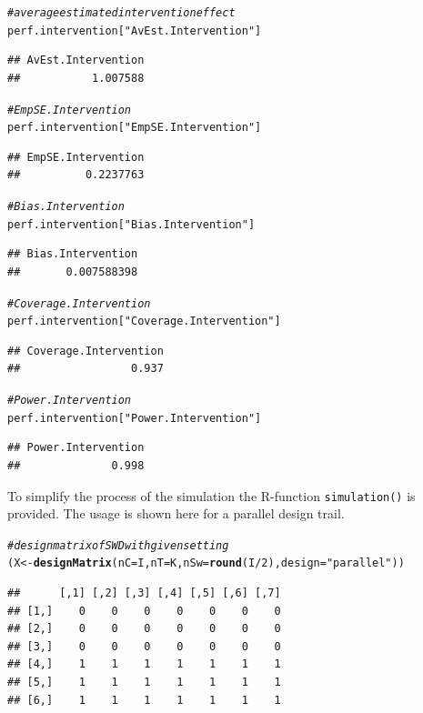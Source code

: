 \documentclass{article}\usepackage[]{graphicx}\usepackage[]{color}
\makeatletter
\newcommand{\hlnum}[1]{\textcolor[rgb]{0.686,0.059,0.569}{#1}}%
\newcommand{\hlstr}[1]{\textcolor[rgb]{0.192,0.494,0.8}{#1}}%
\newcommand{\hlcom}[1]{\textcolor[rgb]{0.678,0.584,0.686}{\textit{#1}}}%
\newcommand{\hlopt}[1]{\textcolor[rgb]{0,0,0}{#1}}%
\newcommand{\hlstd}[1]{\textcolor[rgb]{0.345,0.345,0.345}{#1}}%
\newcommand{\hlkwb}[1]{\textcolor[rgb]{0.69,0.353,0.396}{#1}}%
\newcommand{\hlkwc}[1]{\textcolor[rgb]{0.333,0.667,0.333}{#1}}%
\newcommand{\hlkwd}[1]{\textcolor[rgb]{0.737,0.353,0.396}{\textbf{#1}}}%
\newenvironment{kframe}{%
 \def\at@end@of@kframe{}%
 \ifinner\ifhmode%
  \def\at@end@of@kframe{\end{minipage}}%
  \begin{minipage}{\columnwidth}%
 \fi\fi%
 \def\FrameCommand##1{\hskip\@totalleftmargin \hskip-\fboxsep
 \colorbox{shadecolor}{##1}\hskip-\fboxsep
     \hskip-\linewidth \hskip-\@totalleftmargin \hskip\columnwidth}%
 \MakeFramed {\advance\hsize-\width
   \@totalleftmargin\z@ \linewidth\hsize
   \@setminipage}}%
 {\par\unskip\endMakeFramed%
 \at@end@of@kframe}
\newenvironment{knitrout}{}{} %
\newcommand{\Rfunction}[1]{{\texttt{#1}}}
\makeatother
\begin{document}
\begin{knitrout}
\begin{kframe}
\begin{alltt}
\hlcom{# average estimated intervention effect}
\hlstd{perf.intervention[}\hlstr{"AvEst.Intervention"}\hlstd{]}
\end{alltt}
\begin{verbatim}
## AvEst.Intervention 
##           1.007588
\end{verbatim}
\begin{alltt}
\hlcom{# EmpSE.Intervention}
\hlstd{perf.intervention[}\hlstr{"EmpSE.Intervention"}\hlstd{]}
\end{alltt}
\begin{verbatim}
## EmpSE.Intervention 
##          0.2237763
\end{verbatim}
\begin{alltt}
\hlcom{# Bias.Intervention}
\hlstd{perf.intervention[}\hlstr{"Bias.Intervention"}\hlstd{]}
\end{alltt}
\begin{verbatim}
## Bias.Intervention 
##       0.007588398
\end{verbatim}
\begin{alltt}
\hlcom{# Coverage.Intervention}
\hlstd{perf.intervention[}\hlstr{"Coverage.Intervention"}\hlstd{]}
\end{alltt}
\begin{verbatim}
## Coverage.Intervention 
##                 0.937
\end{verbatim}
\begin{alltt}
\hlcom{# Power.Intervention}
\hlstd{perf.intervention[}\hlstr{"Power.Intervention"}\hlstd{]}
\end{alltt}
\begin{verbatim}
## Power.Intervention 
##              0.998
\end{verbatim}
\end{kframe}
\end{knitrout}


To simplify the process of the simulation the R-function \Rfunction{simulation()} is provided. The usage is shown here for a parallel design trail.

\begin{knitrout}
\color{fgcolor}\begin{kframe}
\begin{alltt}
\hlcom{#design matrix of SWD with given setting}
\hlstd{(X}\hlkwb{<-}\hlkwd{designMatrix}\hlstd{(}\hlkwc{nC}\hlstd{=I,} \hlkwc{nT}\hlstd{=K,} \hlkwc{nSw}\hlstd{=}\hlkwd{round}\hlstd{(I}\hlopt{/}\hlnum{2}\hlstd{),} \hlkwc{design}\hlstd{=}\hlstr{"parallel"}\hlstd{))}
\end{alltt}
\begin{verbatim}
##      [,1] [,2] [,3] [,4] [,5] [,6] [,7]
## [1,]    0    0    0    0    0    0    0
## [2,]    0    0    0    0    0    0    0
## [3,]    0    0    0    0    0    0    0
## [4,]    1    1    1    1    1    1    1
## [5,]    1    1    1    1    1    1    1
## [6,]    1    1    1    1    1    1    1
\end{verbatim}
\end{kframe}
\end{knitrout}
\end{document}
